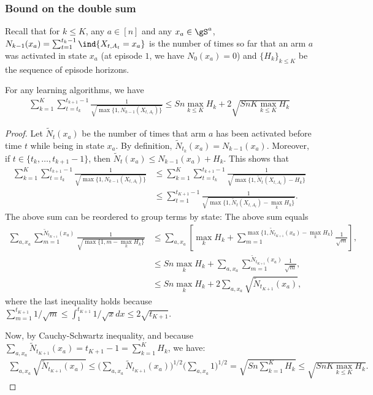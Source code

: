 \subsubsection{Bound on  the double sum}

Recall that for $k\le K$, any $a\in[n]$ and any $x_a\in\gS^a$, $N_{k-1}(x_a)=\sum_{t=1}^{t_{k}-1}\ind{X_{t,A_t}=x_a}$ is the number of times so far that an arm $a$ was activated in state $x_a$ (at episode $1$, we have ${N_0(x_a)=0}$) and $\{H_k\}_{k\le K}$ be the sequence of episode horizons.

\begin{lem}
    \label{lem:sum}
    For any learning algorithms, we have
    \begin{align*}
        \sum_{k=1}^K \sum_{t=t_k}^{t_{k+1}-1}\frac1{\sqrt{\max\{1,N_{k-1}(X_{t,A_t})\} }} \le Sn\max_{k\le K}H_k+2\sqrt{SnK\max_{k\le K}H_k}
    \end{align*}
\end{lem}
\begin{proof}
Let $\tilde{N}_t(x_a)$ be the number of times that arm $a$ has been activated before time $t$ while being in state $x_a$. By definition, $\tilde{N}_{t_k}(x_a)=N_{k-1}(x_a)$. Moreover, if $t\in\{t_k,\dots, t_{k+1}-1\}$, then $\tilde{N}_t(x_a)\le N_{k-1}(x_a) + H_k$. This shows that 
\begin{align*}
    \sum_{k=1}^K \sum_{t=t_k}^{t_{k+1}-1}\frac1{\sqrt{\max\{1,N_{k-1}(X_{t,A_t})\} }}
    &\le \sum_{k=1}^K \sum_{t=t_k}^{t_{k+1}-1}\frac{1}{\sqrt{\max\{1, \tilde{N}_t(X_{t,A_t})-H_k\} }}\\
    &\le \sum_{t=1}^{t_{K+1}-1} \frac{1}{\sqrt{\max\{1,\tilde{N}_t(X_{t,A_t})-\max_k H_k\} }}.
\end{align*}
The above sum can be reordered to group terms by state: The above sum equals
\begin{align*}        
    \sum_{a, x_a} \sum_{m=1}^{\tilde{N}_{t_{K+1}}(x_a)} \frac{1}{\sqrt{\max\{1, m-\max_k H_k\} }}
    &\le \sum_{a, x_a} \left[\max_k H_k + \sum_{m=1}^{\max\{1,\tilde{N}_{t_{K+1}}(x_a)-\max_k H_k\}} \frac{1}{\sqrt{m}}\right],\\
    &\le Sn\max_k H_k + \sum_{a, x_a} \sum_{m=1}^{\tilde{N}_{t_{K+1}}(x_a)} \frac{1}{\sqrt{m}},\\
    &\le Sn\max_k H_k + 2\sum_{a, x_a} \sqrt{\tilde{N}_{t_{K+1}}(x_a)},
\end{align*}
where the last inequality holds because $\sum_{m=1}^{t_{K+1}}1/\sqrt{m}\le\int_1^{t_{K+1}}1/\sqrt{x}dx\le2\sqrt{{t_{K+1}}}$. 

Now, by Cauchy-Schwartz inequality, and because $\sum_{a,x_a}\tilde{N}_{t_{K+1}}(x_a) =t_{K+1}-1 {=}\sum_{k=1}^{K}H_k$, we have:
\begin{align*}
    \sum_{a,x_a}\sqrt{\tilde{N}_{t_{K+1}}(x_a)} \le \Big(\sum_{a,x_a}\tilde{N}_{t_{K+1}}(x_a)\Big)^{1/2}\Big(\sum_{a,x_a}1\Big)^{1/2}=\sqrt{Sn\sum_{k=1}^{K}H_k}\le \sqrt{SnK \max_{k\le K}H_k}.
\end{align*}
\end{proof}

